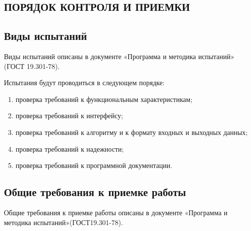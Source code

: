 \pagestyle{fancy}

\normalsize

\begin{center}
	\section{ПОРЯДОК КОНТРОЛЯ И ПРИЕМКИ}
\end{center}

\subsection{Виды испытаний}

\hspace{10mm} Виды испытаний описаны в документе «Программа и методика испытаний» (ГОСТ
19.301-78).

\hspace{10mm} Испытания будут проводиться в следующем порядке:
\begin{enumerate}
	\item проверка требований к функциональным характеристикам;
	\item проверка требований к интерфейсу;
	\item проверка требований к алгоритму и к формату входных и выходных данных;
	\item проверка требований к надежности;
	\item проверка требований к программной документации.
\end{enumerate}

\subsection{Общие требования к приемке работы}

\hspace{10mm} Общие требования к приемке работы описаны в документе «Программа и методика
испытаний»(ГОСТ19.301-78).

